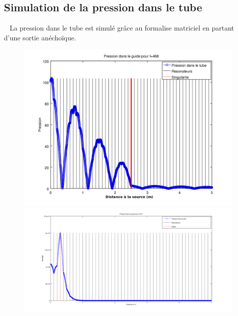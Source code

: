 \documentclass[12pt,notes=show]{beamer} %
\begin{document}
\subsection{Simulation de la pression dans le tube}
\begin{frame}{~}
La pression dans le tube est simulé grâce au formalise matriciel en partant d'une sortie anéchoïque.
\begin{figure}
\centering
\includegraphics[scale=0.1]{visu_pression_defavo.png} \hfill
\includegraphics[scale=0.1]{visu_pression_favo2.png}
\end{figure}
\end{frame}
\end{document}

